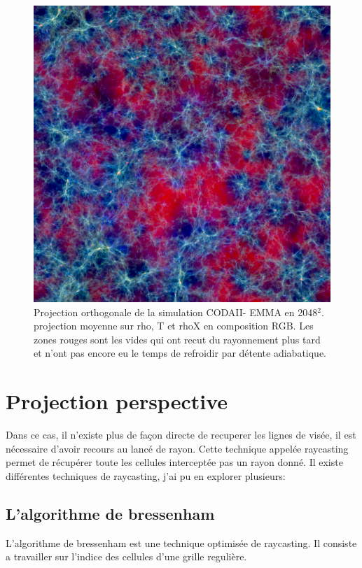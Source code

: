 \begin{figure}[bth]
        \includegraphics[width=.95\linewidth]{img/04/rgb-compose.jpeg} 
        \caption{Projection orthogonale de la simulation CODAII- EMMA en 2048$^2$.
        projection moyenne sur rho, T et rhoX en composition RGB.
Les zones rouges sont les vides qui ont recut du rayonnement plus tard et n'ont pas encore eu le temps de refroidir par détente adiabatique.  
        }
 		\label{fig:ortho}
\end{figure}

\section{Projection perspective}

Dans ce cas, il n'existe plus de façon directe de recuperer les lignes de visée, il est nécessaire d'avoir recours au lancé de rayon.
Cette technique appelée raycasting permet de récupérer toute les cellules interceptée pas un rayon donné.
Il existe différentes techniques de raycasting, j'ai pu en explorer plusieurs:

\subsection{L'algorithme de bressenham}
L'algorithme de bressenham est une technique optimisée de raycasting.
Il consiste a travailler sur l'indice des cellules d'une grille regulière.

